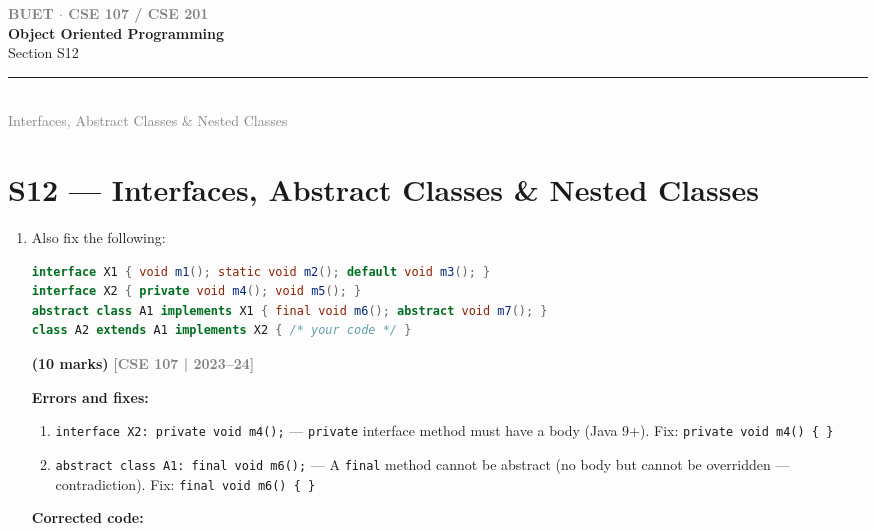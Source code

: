 \documentclass[12pt,a3paper]{article}
\newcommand{\yr}[1]{\hfill\textcolor{gray}{\small\textbf{[#1]}}}
\newcommand{\mk}[1]{\textcolor{orange!70!black}{\small\textbf{(#1 marks)}}}
\newcommand{\secdivider}[4]{%
  \newpage\thispagestyle{empty}%
  \vspace*{\fill}%
  \begin{tcolorbox}[enhanced,colback=#4!7,colframe=#3,boxrule=1.5pt,arc=8pt,
    left=20pt,right=20pt,top=22pt,bottom=22pt,
    shadow={3pt}{-3pt}{0pt}{black!15}]
    \centering
    {\large\textcolor{gray}{\textbf{BUET $\cdot$ CSE 107 / CSE 201}}}\\[8pt]
    {\fontsize{26}{32}\selectfont\bfseries\textcolor{#3}{Object Oriented Programming}}\\[6pt]
    {\fontsize{15}{19}\selectfont\textcolor{dgray}{#1}}\\[12pt]
    \textcolor{#3!60}{\rule{0.5\textwidth}{0.5pt}}\\[6pt]
    {\small\textcolor{gray}{#2}}
  \end{tcolorbox}%
  \vspace*{\fill}\newpage%
}
\begin{document}
\secdivider{Section S12}{Interfaces, Abstract Classes \& Nested Classes}{cD}{cD}
\label{sec:S12}
\titleformat{\section}{\large\bfseries\color{cD}}{}{0em}{}[\titlerule]
\section{S12 --- Interfaces, Abstract Classes \& Nested Classes}

\begin{enumerate}
\item Also fix the following:
\begin{lstlisting}[language=Java]
interface X1 { void m1(); static void m2(); default void m3(); }
interface X2 { private void m4(); void m5(); }
abstract class A1 implements X1 { final void m6(); abstract void m7(); }
class A2 extends A1 implements X2 { /* your code */ }
\end{lstlisting}
\mk{10}
\yr{CSE 107 | 2023--24}

\begin{tcolorbox}[enhanced,breakable,ansbox,
  colback=cD!4,colframe=cD,boxrule=0.8pt,arc=5pt,
  title={\textbf{Answer --- Fix \texttt{X1}/\texttt{X2}/\texttt{A1} \& Write \texttt{A2}}},
  fonttitle=\bfseries\color{white},colbacktitle=cD]

\textbf{Errors and fixes:}

\begin{enumerate}[label=\textbf{\arabic*.}]
  \item \texttt{interface X2: private void m4();} ---
    \texttt{private} interface method must have a body (Java 9+).
    Fix: \texttt{private void m4() \{ \}}

  \item \texttt{abstract class A1: final void m6();} ---
    A \texttt{final} method cannot be abstract (no body but cannot be overridden --- contradiction).
    Fix: \texttt{final void m6() \{ \}}
\end{enumerate}

\textbf{Corrected code:}


\end{tcolorbox}
\end{enumerate}
\end{document}

